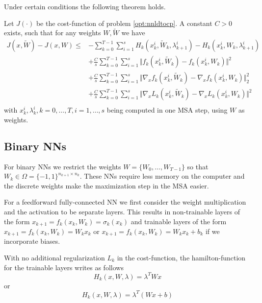 \documentclass[a4paper, 12pt]{scrreprt} %
\begin{document}
Under certain conditions the following theorem holds.

\begin{myTheorem}
Let $J(\cdot)$ be the cost-function of problem \ref{opt:nnldtocp}. A constant $C>0$ exists, such that for any weights $W, \tilde{W}$ we have
\begin{align*}
J(x,\tilde{W}) - J(x,W) \leq &- \sum_{k=0}^{T-1}\sum_{i=1}^s H_k(x_k^i,\tilde{W}_k,\lambda_{k+1}^i)-H_k(x_k^i,W_k,\lambda_{k+1}^i) \\
& + \frac{C}{s} \sum_{k=0}^{T-1}\sum_{i=1}^s \Vert f_k(x_k^i,\tilde{W}_k) - f_k(x_k^i,W_k) \Vert^2 \\
& + \frac{C}{s} \sum_{k=0}^{T-1}\sum_{i=1}^s \Vert \nabla_x f_k(x_k^i,\tilde{W}_k) - \nabla_x f_k(x_k^i,W_k) \Vert^2_2 \\
& + \frac{C}{s} \sum_{k=0}^{T-1}\sum_{i=1}^s \Vert \nabla_x L_k(x_k^i,\tilde{W}_k) - \nabla_x L_k(x_k^i,W_k) \Vert^2 \\
\end{align*}
with $x_k^i, \lambda_k^i, k=0,\dots,T, i=1,\dots,s$ being computed in one \ac{MSA} step, using $W$ as weights.
\end{myTheorem}

\subsection{Binary \aclp{NN}}
\label{subsec:bnn}

For binary \acp{NN} we restrict the weights $W=\{W_0,\dots,W_{T-1}\}$ so that $W_k \in \Omega = \{-1,1\}^{n_{k+1}\times n_{k}}$. These \acp{NN} require less memory on the computer and the discrete weights make the maximization step in the \ac{MSA} easier.\newline

For a feedforward fully-connected \ac{NN} we first consider the weight multiplication and the activation to be separate layers. This results in non-trainable layers of the form $x_{k+1} = f_k(x_k,W_k) = \sigma_k(x_k)$ and trainable layers of the form $x_{k+1} = f_k(x_k,W_k) = W_k x_k$ or $x_{k+1} = f_k(x_k,W_k) = W_k x_k + b_k$ if we incorporate biases.

With no additional regularization $L_k$ in the cost-function, the hamilton-function for the trainable layers writes as follows
\begin{equation}
H_k(x,W,\lambda) = \lambda^T W x 
\end{equation}
or
\begin{equation}
H_k(x,W,\lambda) = \lambda^T (W x+b) 
\end{equation}
\end{document}
